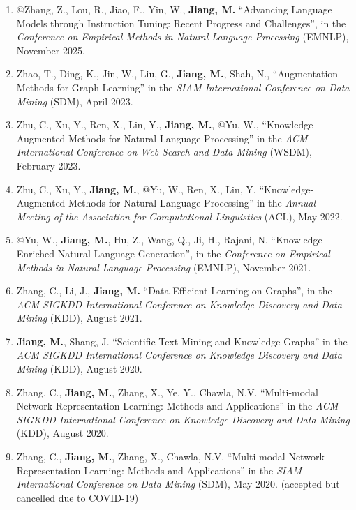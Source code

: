 \documentclass[10pt]{article}
\newenvironment{myindentpar}[1]%
{\begin{list}{}%
         {\setlength{\leftmargin}{#1}}%
         \item[]%
}
{\end{list}}
\newcounter{list}
\begin{document}
\begin{myindentpar}{0.00cm}
\begin{enumerate}[leftmargin=.5cm]
\item[T15] @Zhang, Z., Lou, R., Jiao, F., Yin, W., \textbf{Jiang, M.} ``Advancing Language Models through Instruction Tuning: Recent Progress and Challenges'', in the \textit{Conference on Empirical Methods in Natural Language Processing} (EMNLP), November 2025.
		
\item[T14] Zhao, T., Ding, K., Jin, W., Liu, G., \textbf{Jiang, M.}, Shah, N., ``Augmentation Methods for Graph Learning'' in the \textit{SIAM International Conference on Data Mining} (SDM), April 2023.
		
\item[T13] Zhu, C., Xu, Y., Ren, X., Lin, Y., \textbf{Jiang, M.}, @Yu, W., ``Knowledge-Augmented Methods for Natural Language Processing'' in the \textit{ACM International Conference on Web Search and Data Mining} (WSDM), February 2023.

\item[T12] Zhu, C., Xu, Y., \textbf{Jiang, M.}, @Yu, W., Ren, X., Lin, Y. ``Knowledge-Augmented Methods for Natural Language Processing'' in the \textit{Annual Meeting of the Association for Computational Linguistics} (ACL), May 2022.

\item[T11] @Yu, W., \textbf{Jiang, M.}, Hu, Z., Wang, Q., Ji, H., Rajani, N. ``Knowledge-Enriched Natural Language Generation'', in the \textit{Conference on Empirical Methods in Natural Language Processing} (EMNLP), November 2021.

\item[T10] Zhang, C., Li, J., \textbf{Jiang, M.} ``Data Efficient Learning on Graphs'', in the \textit{ACM SIGKDD International Conference on Knowledge Discovery and Data Mining} (KDD), August 2021.
		
\item[T9] \textbf{Jiang, M.}, Shang, J. ``Scientific Text Mining and Knowledge Graphs'' in the \textit{ACM SIGKDD International Conference on Knowledge Discovery and Data Mining} (KDD), August 2020.
		
\item[T8] Zhang, C., \textbf{Jiang, M.}, Zhang, X., Ye, Y., Chawla, N.V. ``Multi-modal Network Representation Learning: Methods and Applications'' in the \textit{ACM SIGKDD International Conference on Knowledge Discovery and Data Mining} (KDD), August 2020.

\item[T7] Zhang, C., \textbf{Jiang, M.}, Zhang, X., Chawla, N.V. ``Multi-modal Network Representation Learning: Methods and Applications'' in the \textit{SIAM International Conference on Data Mining} (SDM), May 2020. (accepted but cancelled due to COVID-19)


\end{enumerate}
\end{myindentpar}
\end{document}
